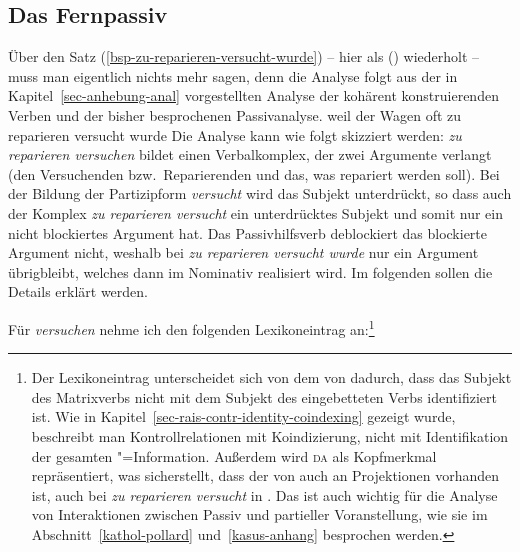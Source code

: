 {\subsection{Das Fernpassiv}
\label{sec-remote-passive-hpsg}


Über den Satz (\ref{bsp-zu-reparieren-versucht-wurde}) -- hier als () wiederholt --
muss man eigentlich nichts mehr sagen, denn die Analyse folgt aus der in Kapitel~\ref{sec-anhebung-anal}
vorgestellten Analyse der kohärent konstruierenden Verben und der bisher besprochenen
Passivanalyse.
\ea
\label{bsp-zu-reparieren-versucht-wurde-zwei}
weil    der Wagen oft zu reparieren versucht wurde
\z
Die Analyse kann wie folgt skizziert werden: \emph{zu reparieren versuchen} bildet einen
Verbalkomplex, der zwei Argumente verlangt (den Versuchenden bzw.\ Reparierenden und das, was
repariert werden soll). Bei der Bildung der Partizipform \emph{versucht} wird das Subjekt
unterdrückt, so dass auch der Komplex \emph{zu reparieren versucht} ein unterdrücktes Subjekt und
somit nur ein nicht blockiertes Argument hat. Das Passivhilfsverb deblockiert das blockierte
Argument nicht, weshalb bei \emph{zu reparieren versucht wurde} nur ein Argument übrigbleibt,
welches dann im Nominativ realisiert wird. Im folgenden sollen die Details erklärt werden.

Für \emph{versuchen} nehme ich den folgenden Lexikoneintrag an:\footnote{
        Der Lexikoneintrag unterscheidet sich von dem von
        \citet[]{HM94a} dadurch, dass das Subjekt des Matrixverbs
        nicht mit dem Subjekt des eingebetteten Verbs identifiziert ist.
        Wie in Kapitel~\ref{sec-rais-contr-identity-coindexing} gezeigt
        wurde, beschreibt man Kontrollrelationen mit Koindizierung, nicht mit Identifikation
        der gesamten "=Information.
        Außerdem wird \textsc{da} als Kopfmerkmal repräsentiert, was
        sicherstellt, dass der \daw von  auch an Projektionen vorhanden ist,
        \dash auch bei \emph{zu reparieren versucht} in .
        Das ist auch wichtig für die Analyse von Interaktionen zwischen Passiv
        und partieller Voranstellung, wie sie im Abschnitt~\ref{kathol-pollard}
        und~\ref{kasus-anhang} besprochen werden.%
}

}
